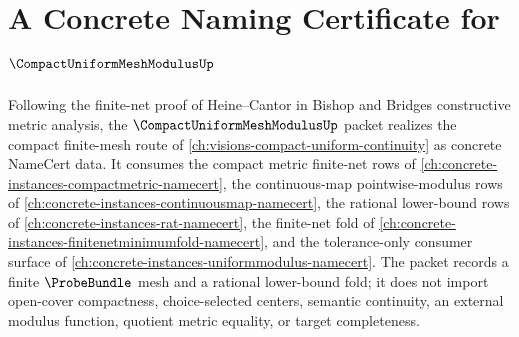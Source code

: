 \chapter{A Concrete Naming Certificate for $\CompactUniformMeshModulusUp$}
\label{ch:concrete-instances-compact-uniform-mesh-modulus-namecert}

Following the finite-net proof of Heine--Cantor in Bishop and Bridges constructive metric analysis, the $\CompactUniformMeshModulusUp$ packet realizes the compact finite-mesh route of \autoref{ch:visions-compact-uniform-continuity} as concrete NameCert data. It consumes the compact metric finite-net rows of \autoref{ch:concrete-instances-compactmetric-namecert}, the continuous-map pointwise-modulus rows of \autoref{ch:concrete-instances-continuousmap-namecert}, the rational lower-bound rows of \autoref{ch:concrete-instances-rat-namecert}, the finite-net fold of \autoref{ch:concrete-instances-finitenetminimumfold-namecert}, and the tolerance-only consumer surface of \autoref{ch:concrete-instances-uniformmodulus-namecert}. The packet records a finite $\ProbeBundle$ mesh and a rational lower-bound fold; it does not import open-cover compactness, choice-selected centers, semantic continuity, an external modulus function, quotient metric equality, or target completeness.

